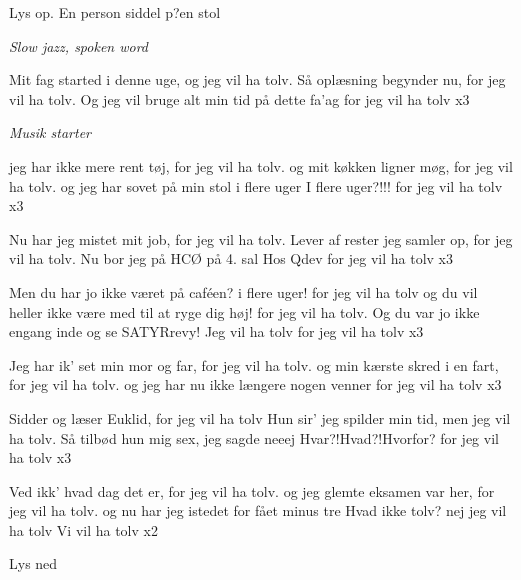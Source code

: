 \documentclass[a4paper,11pt]{article}
\begin{document}
\begin{sketch}

\scene Lys op. En person siddel p?en stol

\emph{Slow jazz, spoken word}

 Mit fag started i denne uge, og jeg vil ha tolv.
 Så oplæsning begynder nu, for jeg vil ha tolv.
 Og jeg vil bruge alt min tid på dette fa'ag
 for jeg vil ha tolv x3

\emph{Musik starter}

 jeg har ikke mere rent tøj, for jeg vil ha tolv.
 og mit køkken ligner møg, for jeg vil ha tolv.
 og jeg har sovet på min stol i flere uger
 I flere uger?!!!
 for jeg vil ha tolv x3


 Nu har jeg mistet mit job, for jeg vil ha tolv.
 Lever af rester jeg samler op, for jeg vil ha tolv.
 Nu bor jeg på HCØ på 4. sal
 Hos Qdev
 for jeg vil ha tolv x3

 Men du har jo ikke været på caféen? i flere uger!
 for jeg vil ha tolv
 og du vil heller ikke være med til at ryge dig høj!
 for jeg vil ha tolv.
 Og du var jo ikke engang inde og se SATYRrevy!
 Jeg vil ha tolv
 for jeg vil ha tolv x3

 Jeg har ik' set min mor og far, for jeg vil ha tolv.
 og min kærste skred i en fart, for jeg vil ha tolv.
 og jeg har nu ikke længere nogen venner
 for jeg vil ha tolv x3


 Sidder og læser Euklid, for jeg vil ha tolv
 Hun sir' jeg spilder min tid, men jeg vil ha tolv.
 Så tilbød hun mig sex, jeg sagde neeej
 Hvar?!Hvad?!Hvorfor?
 for jeg vil ha tolv x3

 Ved ikk' hvad dag det er, for jeg vil ha tolv.
 og jeg glemte eksamen var her, for jeg vil ha tolv.
 og nu har jeg istedet for fået minus tre
 Hvad ikke tolv?
 nej jeg vil ha tolv
 Vi vil ha tolv x2




\scene Lys ned

\end{sketch}
\end{document}
